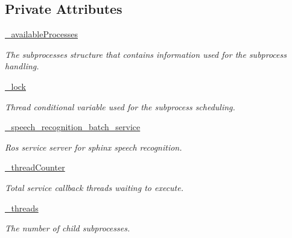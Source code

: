 \subsection*{Private Attributes}
\begin{DoxyCompactItemize}
\item 
\hyperlink{classrapp__speech__detection__sphinx4_1_1speech__recognition__sphinx4__handler__node_1_1SpeechRecognitionSphinx4HandlerNode_a528ab714ddc50a375936f09d62ec2a8a}{\-\_\-available\-Processes}
\begin{DoxyCompactList}\small\item\em The subprocesses structure that contains information used for the subprocess handling. \end{DoxyCompactList}\item 
\hyperlink{classrapp__speech__detection__sphinx4_1_1speech__recognition__sphinx4__handler__node_1_1SpeechRecognitionSphinx4HandlerNode_a26891ed7d1142f5f72cf81c7ff98d8d2}{\-\_\-lock}
\begin{DoxyCompactList}\small\item\em Thread conditional variable used for the subprocess scheduling. \end{DoxyCompactList}\item 
\hyperlink{classrapp__speech__detection__sphinx4_1_1speech__recognition__sphinx4__handler__node_1_1SpeechRecognitionSphinx4HandlerNode_a8ab91d66cd73549bbd374c2ead550323}{\-\_\-speech\-\_\-recognition\-\_\-batch\-\_\-service}
\begin{DoxyCompactList}\small\item\em Ros service server for sphinx speech recognition. \end{DoxyCompactList}\item 
\hyperlink{classrapp__speech__detection__sphinx4_1_1speech__recognition__sphinx4__handler__node_1_1SpeechRecognitionSphinx4HandlerNode_a385903b4de07e56f2d6b341c67497053}{\-\_\-thread\-Counter}
\begin{DoxyCompactList}\small\item\em Total service callback threads waiting to execute. \end{DoxyCompactList}\item 
\hyperlink{classrapp__speech__detection__sphinx4_1_1speech__recognition__sphinx4__handler__node_1_1SpeechRecognitionSphinx4HandlerNode_ab0d95faf8af87481f4d1cc04dca1ff9c}{\-\_\-threads}
\begin{DoxyCompactList}\small\item\em The number of child subprocesses. \end{DoxyCompactList}\end{DoxyCompactItemize}


